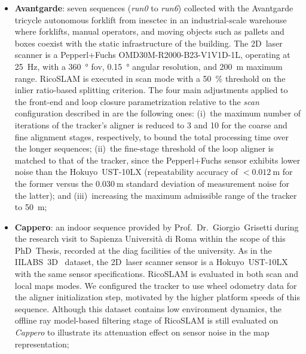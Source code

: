 \begin{itemize}
\item \textbf{Avantgarde}: seven sequences (\emph{run0} to \emph{run6})
      collected with the Avantgarde tricycle autonomous forklift from
      \gls{inesctec} in an industrial-scale warehouse where forklifts, manual
      operators, and moving objects such as pallets and boxes coexist with
      the static infrastructure of the building. The 2D~laser scanner is
      a Pepperl+Fuchs OMD30M-R2000-B23-V1V1D-1L, operating at
      \SI{25}{\hertz}, with a \SI{360}{\degree} \gls{fov},
      \SI{0.15}{\degree} angular resolution, and \SI{200}{\metre} maximum
      range. RicoSLAM is executed in scan mode with a \SI{50}{\percent}
      threshold on the inlier ratio-based splitting criterion.
      The four main adjustments applied to the front-end and loop closure
      parametrization relative to the \emph{scan} configuration described in
       are the following ones:
      (i)~the maximum number of iterations of the tracker's
      aligner is reduced to 3 and 10 for the coarse and fine alignment
      stages, respectively, to bound the total processing time over the
      longer sequences;
      (ii)~the fine-stage threshold of the loop aligner is matched to
      that of the tracker, since the Pepperl+Fuchs sensor exhibits lower
      noise than the Hokuyo~UST-10LX (repeatability accuracy of
      $< \SI{0.012}{\metre}$ for the former versus the $\SI{0.030}{\metre}$
      standard deviation of measurement noise for the latter); and
      (iii)~increasing the maximum admissible range of the tracker to
      \SI{50}{\metre};

\item \textbf{Cappero}: an indoor sequence provided by
      Prof.~Dr.~Giorgio~Grisetti during the research visit to
      Sapienza Università di Roma within the scope of this PhD~Thesis,
      recorded at the \gls{diag} facilities of the university.
      As in the IILABS~3D~\cite{ribeiro:access:2025} dataset,
      the 2D~laser scanner sensor is a Hokuyo~UST-10LX with the same sensor
      specifications. RicoSLAM is evaluated in both scan and local maps modes.
      We configured the tracker to use wheel odometry data for the aligner
      initialization step, motivated by the higher platform speeds of this sequence.
      Although this dataset contains low environment dynamics,
      the offline ray model-based filtering stage of RicoSLAM is still
      evaluated on \emph{Cappero} to illustrate its attenuation
      effect on sensor noise in the map representation;


\end{itemize}
